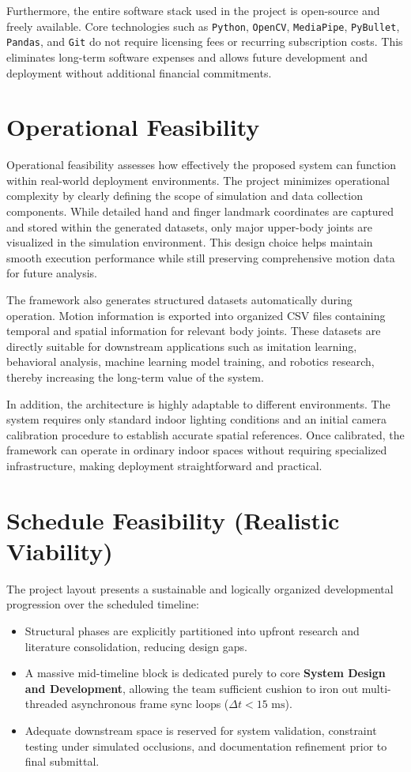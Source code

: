 Furthermore, the entire software stack used in the project is open-source and freely available. Core technologies such as \texttt{Python}, \texttt{OpenCV}, \texttt{MediaPipe}, \texttt{PyBullet}, \texttt{Pandas}, and \texttt{Git} do not require licensing fees or recurring subscription costs. This eliminates long-term software expenses and allows future development and deployment without additional financial commitments.

\section{Operational Feasibility}

Operational feasibility assesses how effectively the proposed system can function within real-world deployment environments. The project minimizes operational complexity by clearly defining the scope of simulation and data collection components. While detailed hand and finger landmark coordinates are captured and stored within the generated datasets, only major upper-body joints are visualized in the simulation environment. This design choice helps maintain smooth execution performance while still preserving comprehensive motion data for future analysis.

The framework also generates structured datasets automatically during operation. Motion information is exported into organized CSV files containing temporal and spatial information for relevant body joints. These datasets are directly suitable for downstream applications such as imitation learning, behavioral analysis, machine learning model training, and robotics research, thereby increasing the long-term value of the system.

In addition, the architecture is highly adaptable to different environments. The system requires only standard indoor lighting conditions and an initial camera calibration procedure to establish accurate spatial references. Once calibrated, the framework can operate in ordinary indoor spaces without requiring specialized infrastructure, making deployment straightforward and practical.

\section{Schedule Feasibility (Realistic Viability)}
The project layout presents a sustainable and logically organized developmental progression over the scheduled timeline:
\begin{itemize}
    \item Structural phases are explicitly partitioned into upfront research and literature consolidation, reducing design gaps.
    \item A massive mid-timeline block is dedicated purely to core \textbf{System Design and Development}, allowing the team sufficient cushion to iron out multi-threaded asynchronous frame sync loops ($\Delta t < 15\text{ ms}$).
    \item Adequate downstream space is reserved for system validation, constraint testing under simulated occlusions, and documentation refinement prior to final submittal.
\end{itemize}

